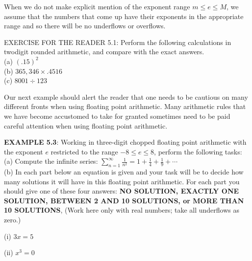 \documentclass[../main.tex]{subfiles}
\begin{document}
When we do not make explicit mention of the exponent range $m \leq e \leq M$, we assume that the numbers that come up have their exponents in the appropriate range and so there will be no underflows or overflows.

EXERCISE FOR THE READER 5.1: Perform the following calculations in twodigit rounded arithmetic, and compare with the exact answers.\\
(a) $(.15)^{2}$\\
(b) $365,346 \times .4516$\\
(c) $8001 \div 123$

Our next example should alert the reader that one needs to be cautious on many different fronts when using floating point arithmetic. Many arithmetic rules that we have become accustomed to take for granted sometimes need to be paid careful attention when using floating point arithmetic.

\textbf{EXAMPLE 5.3}: Working in three-digit chopped floating point arithmetic with the exponent $e$ restricted to the range $-8 \leq e \leq 8$, perform the following tasks: (a) Compute the infinite series: $\sum_{n=1}^{\infty} \frac{1}{n^{2}}=1+\frac{1}{4}+\frac{1}{9}+\cdots$\\

(b) In each part below an equation is given and your task will be to decide how many solutions it will have in this floating point arithmetic. For each part you should give one of these four answers: \textbf{NO SOLUTION, EXACTLY ONE SOLUTION, BETWEEN 2 AND 10 SOLUTIONS, or MORE THAN 10 SOLUTIONS}, (Work here only with real numbers; take all underflows as zero.)

(i) $3 x=5$

(ii) $x^{3}=0$
\end{document}
